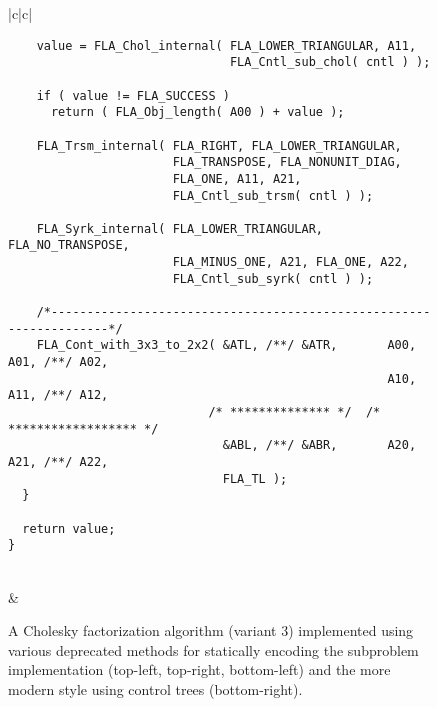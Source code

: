 \begin{figure}[tbp]
\begin{center}
\begin{tabular}{|c|c|}
\begin{minipage}[t]{3in}
{\begin{verbatim}
    value = FLA_Chol_internal( FLA_LOWER_TRIANGULAR, A11,
                               FLA_Cntl_sub_chol( cntl ) );

    if ( value != FLA_SUCCESS )
      return ( FLA_Obj_length( A00 ) + value );

    FLA_Trsm_internal( FLA_RIGHT, FLA_LOWER_TRIANGULAR,
                       FLA_TRANSPOSE, FLA_NONUNIT_DIAG,
                       FLA_ONE, A11, A21,
                       FLA_Cntl_sub_trsm( cntl ) );

    FLA_Syrk_internal( FLA_LOWER_TRIANGULAR, FLA_NO_TRANSPOSE,
                       FLA_MINUS_ONE, A21, FLA_ONE, A22,
                       FLA_Cntl_sub_syrk( cntl ) );

    /*-------------------------------------------------------------------*/
    FLA_Cont_with_3x3_to_2x2( &ATL, /**/ &ATR,       A00, A01, /**/ A02,
                                                     A10, A11, /**/ A12,
                            /* ************** */  /* ****************** */
                              &ABL, /**/ &ABR,       A20, A21, /**/ A22,
                              FLA_TL );
  }

  return value;
}
\end{verbatim}
}
\end{minipage}
\\
 & \\ \hline
\end{tabular}
\end{center}
\caption{
A Cholesky factorization algorithm (variant 3) implemented using various
deprecated methods for statically encoding the subproblem implementation
(top-left, top-right, bottom-left) and the more modern style using control
trees (bottom-right).
}
\label{fig:noncntl-cntl-chol-code}
\end{figure}
